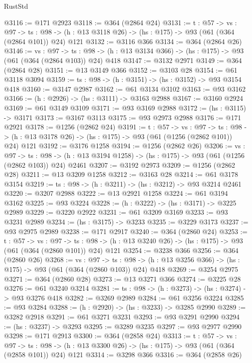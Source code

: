 \begin{lexlean}{RustStd}
\begin{coremodule}
@3116 := @171 @2923
@3118 := @364 (@2864 @24)
@3131 := {t : @57} ->
  {vs : @97} ->
  {ts : @98} -> (h : @13 @3118 @26) -> (hs : @175) -> @93 (@61 (@364 (@2864 @101)) @24) @121
@3132 := @3116 @366
@3134 := @364 (@2864 @26)
@3146 := {vs : @97} ->
  {ts : @98} -> (h : @13 @3134 @366) -> (hs : @175) -> @93 (@61 (@364 (@2864 @103)) @24) @418
@3147 := @3132 @2971
@3149 := @364 (@2864 @28)
@3151 := @13 @3149 @366
@3152 := @3103 @28
@3154 := @61 @3118 @3094
@3159 := {ts : @98} -> (h : @3151) -> (hs : @3152) -> @93 @3154 @418
@3160 := @3147 @2987
@3162 := @61 @3134 @3102
@3163 := @93 @3162
@3166 := (h : @2926) -> (hs : @3111) -> @3163 @2988
@3167 := @3160 @2924
@3169 := @61 @3149 @3109
@3171 := @93 @3169 @2988
@3172 := (hs : @3115) -> @3171
@3173 := @3167 @3113
@3175 := @93 @2973 @2988
@3176 := @171 @2921
@3178 := @1256 (@2862 @24)
@3191 := {t : @57} ->
  {vs : @97} ->
  {ts : @98} -> (h : @13 @3178 @26) -> (hs : @175) -> @93 (@61 (@1256 (@2862 @101)) @24) @121
@3192 := @3176 @1258
@3194 := @1256 (@2862 @26)
@3206 := {vs : @97} ->
  {ts : @98} -> (h : @13 @3194 @1258) -> (hs : @175) -> @93 (@61 (@1256 (@2862 @103)) @24) @2461
@3207 := @3192 @2973
@3209 := @1256 (@2862 @28)
@3211 := @13 @3209 @1258
@3212 := @3163 @28
@3214 := @61 @3178 @3154
@3219 := {ts : @98} -> (h : @3211) -> (hs : @3212) -> @93 @3214 @2461
@3220 := @3207 @2988
@3222 := @13 @2921 @1258
@3224 := @61 @3194 @3162
@3225 := @93 @3224
@3228 := (h : @3222) -> (hs : @3171) -> @3225 @2989
@3229 := @3220 @2922
@3231 := @61 @3209 @3169
@3233 := @93 @3231 @2989
@3234 := (hs : @3175) -> @3233
@3235 := @3229 @3173
@3237 := @93 @2975 @2989
@3238 := @171 @2917
@3240 := @364 (@2860 @24)
@3253 := {t : @57} ->
  {vs : @97} ->
  {ts : @98} -> (h : @13 @3240 @26) -> (hs : @175) -> @93 (@61 (@364 (@2860 @101)) @24) @121
@3254 := @3238 @366
@3256 := @364 (@2860 @26)
@3268 := {vs : @97} ->
  {ts : @98} -> (h : @13 @3256 @366) -> (hs : @175) -> @93 (@61 (@364 (@2860 @103)) @24) @418
@3269 := @3254 @2975
@3271 := @364 (@2860 @28)
@3273 := @13 @3271 @366
@3274 := @3225 @28
@3276 := @61 @3240 @3214
@3281 := {ts : @98} -> (h : @3273) -> (hs : @3274) -> @93 @3276 @418
@3282 := @3269 @2989
@3284 := @61 @3256 @3224
@3285 := @93 @3284
@3288 := (h : @2920) -> (hs : @3233) -> @3285 @2990
@3289 := @3282 @2918
@3291 := @61 @3271 @3231
@3293 := @93 @3291 @2990
@3294 := (hs : @3237) -> @3293
@3295 := @3289 @3235
@3297 := @93 @2977 @2990
@3298 := @171 @2913
@3300 := @364 (@2858 @24)
@3313 := {t : @57} ->
  {vs : @97} ->
  {ts : @98} -> (h : @13 @3300 @26) -> (hs : @175) -> @93 (@61 (@364 (@2858 @101)) @24) @121
@3314 := @3298 @366
@3316 := @364 (@2858 @26)

\end{coremodule}
\end{lexlean}
